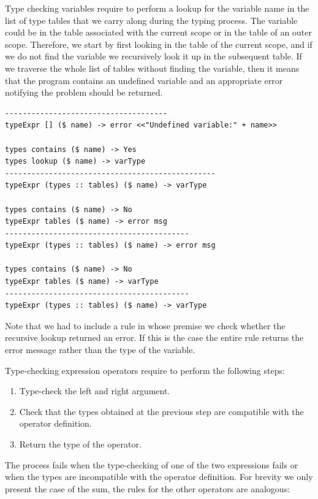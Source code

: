 \noindent
Type checking variables require to perform a lookup for the variable name in the list of type tables that we carry along during the typing process. The variable could be in the table associated with the current scope or in the table of an outer scope. Therefore, we start by first looking in the table of the current scope, and if we do not find the variable we recursively look it up in the subsequent table. If we traverse the whole list of tables without finding the variable, then it means that the program contains an undefined variable and an appropriate error notifying the problem should be returned.

\begin{lstlisting}
-------------------------------------
typeExpr [] ($ name) -> error <<"Undefined variable:" + name>>

types contains ($ name) -> Yes
types lookup ($ name) -> varType
------------------------------------------------
typeExpr (types :: tables) ($ name) -> varType

types contains ($ name) -> No
typeExpr tables ($ name) -> error msg
------------------------------------------
typeExpr (types :: tables) ($ name) -> error msg 

types contains ($ name) -> No
typeExpr tables ($ name) -> varType
------------------------------------------
typeExpr (types :: tables) ($ name) -> varType 
\end{lstlisting}

Note that we had to include a rule in whose premise we check whether the recursive lookup returned an error. If this is the case the entire rule returns the error message rather than the type of the variable.

Type-checking expression operators require to perform the following steps:

\begin{enumerate}[noitemsep]
	\item Type-check the left and right argument.
	\item Check that the types obtained at the previous step are compatible with the operator definition.
	\item Return the type of the operator.
\end{enumerate}

\noindent
The process fails when the type-checking of one of the two expressions fails or when the types are incompatible with the operator definition. For brevity we only present the case of the sum, the rules for the other operators are analogous:

